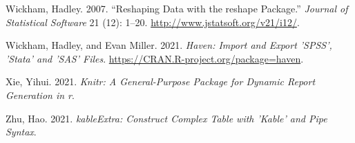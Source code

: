 \documentclass[
]{article}
\newlength{\cslhangindent}
\newlength{\cslentryspacingunit} %
\newenvironment{CSLReferences}[2] %
 {%
  \setlength{\parindent}{0pt}
  \ifodd #1
  \let\oldpar\par
  \def\par{\hangindent=\cslhangindent\oldpar}
  \fi
  \setlength{\parskip}{#2\cslentryspacingunit}
 }%
 {}
\begin{document}
\begin{CSLReferences}{1}{0}
\leavevmode{}%
Wickham, Hadley. 2007. {``Reshaping Data with the {reshape} Package.''} \emph{Journal of Statistical Software} 21 (12): 1--20. \url{http://www.jstatsoft.org/v21/i12/}.

\leavevmode{}%
Wickham, Hadley, and Evan Miller. 2021. \emph{Haven: Import and Export 'SPSS', 'Stata' and 'SAS' Files}. \url{https://CRAN.R-project.org/package=haven}.

\leavevmode{}%
Xie, Yihui. 2021. \emph{Knitr: A General-Purpose Package for Dynamic Report Generation in r}.

\leavevmode{}%
Zhu, Hao. 2021. \emph{kableExtra: Construct Complex Table with 'Kable' and Pipe Syntax}.

\end{CSLReferences}
\end{document}
